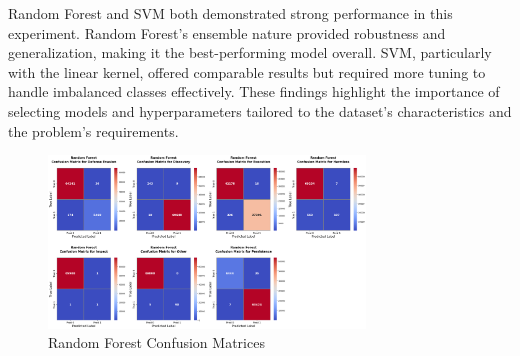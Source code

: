        Random Forest and SVM both demonstrated strong performance in this experiment. Random Forest's ensemble nature provided robustness and generalization, making it the best-performing model overall. SVM, particularly with the linear kernel, offered comparable results but required more tuning to handle imbalanced classes effectively. These findings highlight the importance of selecting models and hyperparameters tailored to the dataset's characteristics and the problem's requirements.     
        
        
        
        \clearpage

        
        \begin{figure}[H]
        
            \centering
            
            \begin{minipage}{\textwidth}
                \centering
                \begin{minipage}[c]{\textwidth}
                    \centering
                    \includegraphics[width=0.75\textwidth]{../figures/plots/section2/Random_Forest_confusion_matrices.png}
                    \caption{Random Forest Confusion Matrices}
                    \label{fig:rf_cm_base}
                \end{minipage}%
            \end{minipage}

            \vspace{0.5cm}  %
            

\end{figure}
